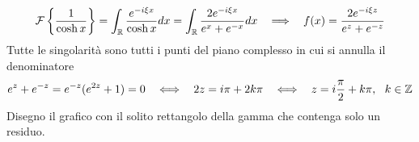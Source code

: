 \begin{equation*}
\Fc \left\{\frac{1}{\cosh x}\right\} = \int _{\RR }\frac{e^{ - i\xi x}}{\cosh x} dx = \int _{\RR }\frac{2e^{ - i\xi x}}{e^{x} + e^{ - x}} dx\ \ \implies \ \ f(x) = \frac{2e^{ - i\xi z}}{e^{z} + e^{ - z}}
\end{equation*}
Tutte le singolarità sono tutti i punti del piano complesso in cui si annulla il denominatore 
\begin{equation*}
e^{z} + e^{ - z} = e^{ - z} (e^{2z} + 1) = 0\ \ \iff \ \ 2z = i\pi + 2k\pi \ \ \iff \ \ z = i\frac{\pi }{2} + k\pi ,\ \ k\in \ZZ 
\end{equation*}
Disegno il grafico con il solito rettangolo della gamma che contenga solo un residuo.


\begin{figure}[htpb]
	\centering
{} %

\begin{tikzpicture}[x = 0.75pt,y = 0.75pt,yscale = -1,xscale = 1]


\end{tikzpicture}
\end{figure}
